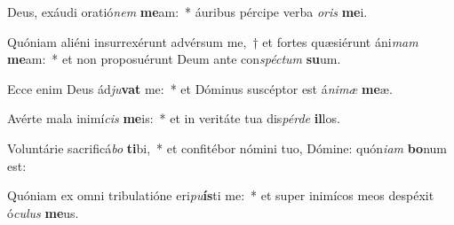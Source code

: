 \item Deus, exáudi oratió\textit{nem} \textbf{me}am:~* áuribus pércipe verba \textit{o}\textit{ris} \textbf{me}i.
\item Quóniam aliéni insurrexérunt advérsum me,~† et fortes quæsiérunt áni\textit{mam} \textbf{me}am:~* et non proposuérunt Deum ante con\textit{spéc}\textit{tum} \textbf{su}um.
\item Ecce enim Deus ád\textit{ju}\textbf{vat} me:~* et Dóminus suscéptor est á\textit{ni}\textit{mæ} \textbf{me}æ.
\item Avérte mala inimí\textit{cis} \textbf{me}is:~* et in veritáte tua dis\textit{pér}\textit{de} \textbf{il}los.
\item Voluntárie sacrificá\textit{bo} \textbf{ti}bi,~* et confitébor nómini tuo, Dómine: quón\textit{i}\textit{am} \textbf{bo}num est:
\item Quóniam ex omni tribulatióne eri\textit{pu}\textbf{ís}ti me:~* et super inimícos meos despéxit ó\textit{cu}\textit{lus} \textbf{me}us.
